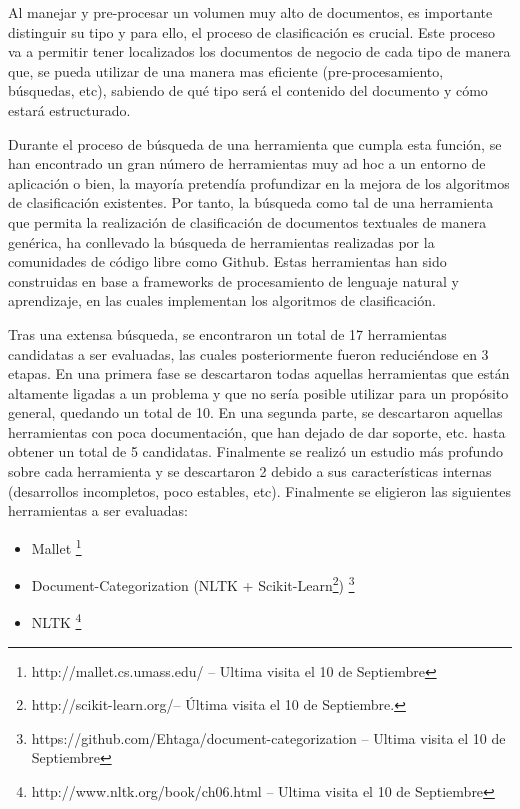 \documentclass[runningheads,a4paper]{llncs}
\theoremstyle{break}
\begin{document}
Al manejar y pre-procesar un volumen muy alto de documentos, es importante distinguir su tipo y para ello, el proceso de clasificación es crucial. Este proceso va a permitir tener localizados los documentos de negocio de cada tipo de manera que, se pueda utilizar de una manera mas eficiente (pre-procesamiento, búsquedas, etc), sabiendo de qué tipo será el contenido del documento y cómo estará estructurado.

Durante el proceso de búsqueda de una herramienta que cumpla esta función, se han encontrado un gran número de herramientas muy ad hoc a un entorno de aplicación o bien, la mayoría pretendía profundizar en la mejora de los algoritmos de clasificación existentes. Por tanto, la búsqueda como tal de una herramienta que permita la realización de clasificación de documentos textuales de manera genérica, ha conllevado la búsqueda de herramientas realizadas por la comunidades de código libre como Github. Estas herramientas han sido construidas en base a frameworks de procesamiento de lenguaje natural y aprendizaje, en las cuales implementan los algoritmos de clasificación.

Tras una extensa búsqueda, se encontraron un total de 17 herramientas candidatas a ser evaluadas, las cuales posteriormente fueron reduciéndose en 3 etapas. En una primera fase se descartaron todas aquellas herramientas que están altamente ligadas a un problema y que no sería posible utilizar para un propósito general, quedando un total de 10. En una segunda parte, se descartaron aquellas herramientas con poca documentación, que han dejado de dar soporte, etc. hasta obtener un total de 5 candidatas. Finalmente se realizó un estudio más profundo sobre cada herramienta y se descartaron 2 debido a sus características internas (desarrollos incompletos, poco estables, etc). Finalmente se eligieron las siguientes herramientas a ser evaluadas:

\begin{itemize}
	\item Mallet \footnote{http://mallet.cs.umass.edu/ -- Ultima visita el 10 de Septiembre}
    \item Document-Categorization (NLTK + Scikit-Learn\footnote{ http://scikit-learn.org/-- Última visita el 10 de Septiembre.}) \footnote{https://github.com/Ehtaga/document-categorization -- Ultima visita el 10 de Septiembre}
    \item NLTK   \footnote{http://www.nltk.org/book/ch06.html -- Ultima visita el 10 de Septiembre}
\end{itemize}
\end{document}
